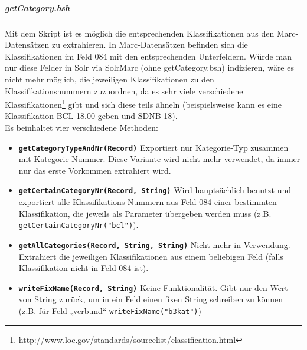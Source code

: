 \documentclass[10pt]{article}
\begin{document}
\subparagraph{getCategory.bsh} 
Mit dem Skript ist es möglich die entsprechenden Klassifikationen aus den Marc-Datensätzen zu extrahieren. In Marc-Datensätzen befinden sich die Klassifikationen im Feld 084 mit den entsprechenden Unterfeldern. Würde man nur diese Felder in Solr via SolrMarc (ohne getCategory.bsh) indizieren, wäre es nicht mehr möglich, die jeweiligen Klassifikationen zu den Klassifikationsnummern zuzuordnen, da es sehr viele verschiedene Klassifikationen\footnote{\url{http://www.loc.gov/standards/sourcelist/classification.html}} gibt und sich diese teils ähneln (beispielsweise kann es eine Klassifikation BCL 18.00 geben und SDNB 18). \\
Es beinhaltet vier verschiedene Methoden:
\begin{itemize}
	\item \textbf{\texttt{getCategoryTypeAndNr(Record)}} Exportiert nur Kategorie-Typ zusammen mit Kategorie-Nummer. Diese Variante wird nicht mehr verwendet, da  immer nur das erste Vorkommen extrahiert wird.
	\item \textbf{\texttt{getCertainCategoryNr(Record, String)}} Wird hauptsächlich benutzt und exportiert alle Klassifikations-Nummern aus Feld 084 einer bestimmten Klassifikation, die jeweils als Parameter übergeben werden muss (z.B. \texttt{getCertainCategoryNr("bcl")}).
	\item \textbf{\texttt{getAllCategories(Record, String, String)}} Nicht mehr in Verwendung. Extrahiert die jeweiligen Klassifikationen aus einem beliebigen Feld (falls Klassifikation nicht in Feld 084 ist).
	\item \textbf{\texttt{writeFixName(Record, String)}} Keine Funktionalität. Gibt nur den Wert von String zurück, um in ein Feld einen fixen String schreiben zu können (z.B. für Feld „verbund“ \texttt{writeFixName("b3kat")})
\end{itemize}
\end{document}
